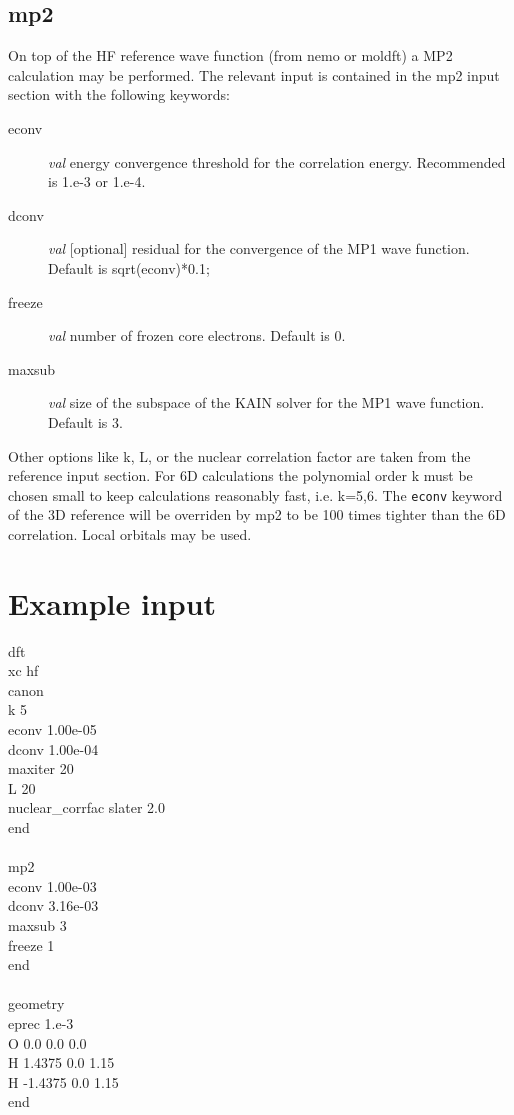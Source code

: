 \documentclass[10pt]{article}
\begin{document}
\subsection{mp2}
On top of the HF reference wave function (from nemo or moldft) a MP2 calculation may be performed. 
The relevant input is contained in the mp2 input section with the following keywords:
\begin{description}
\item[econv] \textit{val} energy convergence threshold for the correlation energy. Recommended is 1.e-3 or 1.e-4.
\item[dconv]  \textit{val}  [optional] residual for the convergence of the MP1 wave function. Default is sqrt(econv)*0.1;
\item[freeze]  \textit{val}  number of frozen core electrons. Default is 0.
\item[maxsub]  \textit{val}  size of the subspace of the KAIN solver for the MP1 wave function. Default is 3.
\end{description}
Other options like k, L, or the nuclear correlation factor are taken from the reference input section.
For 6D calculations the polynomial order k must be chosen small to keep calculations reasonably fast, i.e. k=5,6. 
The \texttt{econv} keyword of the 3D reference will be overriden by mp2 to be 100 times tighter than the 6D correlation.
Local orbitals may be used.

\section{Example input}
dft\\
  xc       hf\\
  canon\\
  k        5\\
  econv    1.00e-05\\
  dconv    1.00e-04\\
  maxiter  20\\
  L        20\\
  nuclear\_corrfac  slater  2.0\\
end\\
\\
mp2\\
  econv    1.00e-03\\
  dconv    3.16e-03\\
  maxsub   3\\
  freeze   1\\
end\\
\\
geometry\\
  eprec 1.e-3\\
  O  0.0    0.0 0.0\\
  H  1.4375 0.0 1.15\\
  H -1.4375 0.0 1.15\\
end\\



\end{document}
